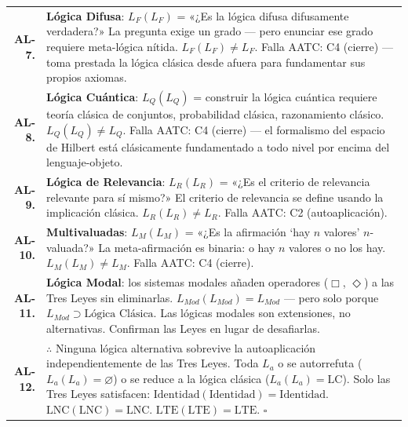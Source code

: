 \documentclass[10pt, openany, oneside]{book}
\begin{document}
{\begin{tabular}{r p{}}
\textbf{AL-7.} & \textbf{Lógica Difusa}: $L_F(L_F)$ = «¿Es la lógica difusa difusamente verdadera?» La pregunta exige un grado --- pero enunciar ese grado requiere meta-lógica nítida. $L_F(L_F) \neq L_F$. Falla AATC: C4 (cierre) --- toma prestada la lógica clásica desde afuera para fundamentar sus propios axiomas. \\[0.3em]
\textbf{AL-8.} & \textbf{Lógica Cuántica}: $L_Q(L_Q)$ = construir la lógica cuántica requiere teoría clásica de conjuntos, probabilidad clásica, razonamiento clásico. $L_Q(L_Q) \neq L_Q$. Falla AATC: C4 (cierre) --- el formalismo del espacio de Hilbert está clásicamente fundamentado a todo nivel por encima del lenguaje-objeto. \\[0.3em]
\textbf{AL-9.} & \textbf{Lógica de Relevancia}: $L_R(L_R)$ = «¿Es el criterio de relevancia relevante para sí mismo?» El criterio de relevancia se define usando la implicación clásica. $L_R(L_R) \neq L_R$. Falla AATC: C2 (autoaplicación). \\[0.3em]
\textbf{AL-10.} & \textbf{Multivaluadas}: $L_M(L_M)$ = «¿Es la afirmación `hay $n$ valores' $n$-valuada?» La meta-afirmación es binaria: o hay $n$ valores o no los hay. $L_M(L_M) \neq L_M$. Falla AATC: C4 (cierre). \\[0.3em]
\textbf{AL-11.} & \textbf{Lógica Modal}: los sistemas modales añaden operadores ($\Box$, $\Diamond$) a las Tres Leyes sin eliminarlas. $L_{Mod}(L_{Mod}) = L_{Mod}$ --- pero solo porque $L_{Mod} \supset \text{Lógica Clásica}$. Las lógicas modales son extensiones, no alternativas. Confirman las Leyes en lugar de desafiarlas. \\[0.3em]
\textbf{AL-12.} & $\therefore$ Ninguna lógica alternativa sobrevive la autoaplicación independientemente de las Tres Leyes. Toda $L_a$ o se autorrefuta ($L_a(L_a) = \varnothing$) o se reduce a la lógica clásica ($L_a(L_a) = \text{LC}$). Solo las Tres Leyes satisfacen: $\text{Identidad}(\text{Identidad}) = \text{Identidad}$. $\text{LNC}(\text{LNC}) = \text{LNC}$. $\text{LTE}(\text{LTE}) = \text{LTE}$. $\square$ \\[0.3em]
\end{tabular}
}

\vspace{0.8em}
\end{document}
